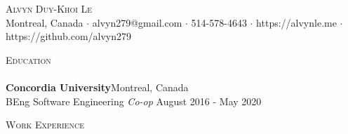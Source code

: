 \documentclass[a4paper]{article}
\newcommand{\lineunder} {
    \vspace*{-8pt} \\
    \hspace*{-18pt} \hrulefill \\
}
\newcommand{\header} [1] {
    {\hspace*{-18pt}\vspace*{6pt} \textsc{#1}}
    \vspace*{-6pt} \lineunder
}
\begin{document}
\vspace*{-40pt}

    

\vspace*{-10pt}
\begin{center}
	{\Huge \scshape {Alvyn Duy-Khoi Le}}\\
	Montreal, Canada $\cdot$ alvyn279@gmail.com $\cdot$ 514-578-4643 $\cdot$ https://alvynle.me  $\cdot$ https://github.com/alvyn279\\
\end{center}

\header{Education}
\textbf{Concordia University}\hfill Montreal, Canada\\
BEng Software Engineering \textit{Co-op} \hfill August 2016 - May 2020\\
\vspace{2mm}

\header{Work Experience}
\vspace{1mm}
\end{document}
